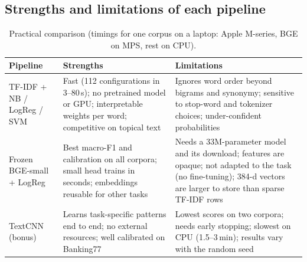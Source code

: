 \subsection{Strengths and limitations of each pipeline}
\begin{table}[H]
\centering
\footnotesize
\caption{Practical comparison (timings for one corpus on a laptop: Apple M-series, BGE on MPS, rest on CPU).}
\label{tab:tradeoffs}
\begin{tabular}{@{}P{2.3cm}P{5.6cm}P{5.6cm}@{}}
\toprule
Pipeline & Strengths & Limitations \\
\midrule
TF-IDF + NB / LogReg / SVM & Fast (112 configurations in 3--80\,s); no pretrained model or GPU; interpretable weights per word; competitive on topical text & Ignores word order beyond bigrams and synonymy; sensitive to stop-word and tokenizer choices; under-confident probabilities \\
\addlinespace
Frozen BGE-small + LogReg & Best macro-F1 and calibration on all corpora; small head trains in seconds; embeddings reusable for other tasks & Needs a 33M-parameter model and its download; features are opaque; not adapted to the task (no fine-tuning); 384-d vectors are larger to store than sparse TF-IDF rows \\
\addlinespace
TextCNN (bonus) & Learns task-specific patterns end to end; no external resources; well calibrated on Banking77 & Lowest scores on two corpora; needs early stopping; slowest on CPU (1.5--3\,min); results vary with the random seed \\
\bottomrule
\end{tabular}
\end{table}

